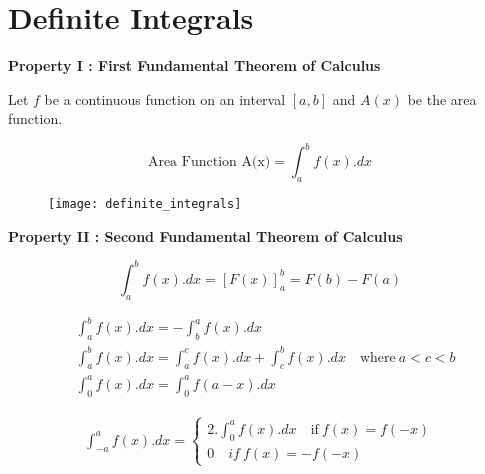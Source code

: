 \section{ Definite Integrals}

\textbf{Property I : First Fundamental Theorem of Calculus}

\vspace{5mm}
Let $f$ be a continuous function on an interval $[a,b]$ and $A(x)$ be the area function.

\vspace{2mm}

\begin{tcolorbox}
\begin{center}
\[ \text{Area Function A(x)} = \int_{a}^{b} f(x).dx \]
\end{center}
\end{tcolorbox}

\begin{figure}[ht]
    \centering
    \texttt{[image: definite\_integrals]} 
    \label{definite_int}
\end{figure}

\textbf{Property II : Second Fundamental Theorem of Calculus}

\vspace{5mm}

\begin{tcolorbox}
\begin{center}
\[ \int_{a}^{b} f(x).dx = [F(x)]^{b}_{a} = F(b) - F(a) \]
\end{center}
\end{tcolorbox}

\vspace{5mm}

\begin{align}
&\int^{b}_{a} f(x).dx = - \int^{a}_{b} f(x).dx \\[5mm]
&\int^{b}_{a} f(x).dx = \int^{c}_{a} f(x).dx + \int^{b}_{c} f(x).dx \quad \text{where} \: a<c<b \\[5mm]
&\int^{a}_{0}f(x).dx = \int^{a}_{0}f(a-x).dx
\end{align}


\begin{align}
\int^{a}_{-a}f(x).dx = 
\begin{cases}
2.\int^{a}_{0} f(x).dx \quad \text{if} \: f(x) = f(-x) \\
0 \quad if \: f(x) = -f(-x) 
\end{cases}
\end{align}

